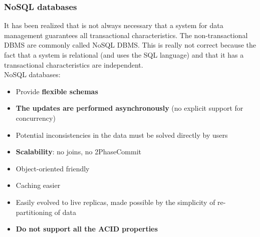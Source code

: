 \documentclass[10pt,a4paper]{article}
\begin{document}
\begin{justify}
\subsubsection{NoSQL databases}
It has been realized that is not always necessary that a system for data management guarantees all transactional characteristics. The non-transactional DBMS are commonly called NoSQL DBMS. This is really not correct because the fact that a system is relational (and uses the SQL language) and that it has a transactional characteristics are independent. \\
NoSQL databases:
\begin{itemize}
	\item Provide \textbf{flexible schemas}
	\item \textbf{The updates are performed asynchronously} (no explicit support for concurrency)
	\item Potential inconsistencies in the data must be solved directly by users
	\item \textbf{Scalability}: no joins, no 2PhaseCommit
	\item Object-oriented friendly
	\item Caching easier
	\item Easily evolved to live replicas, made possible by the simplicity of re-partitioning of data
	\item \textbf{Do not support all the ACID properties}
\end{itemize}
\pagebreak

\end{justify}
\end{document}
